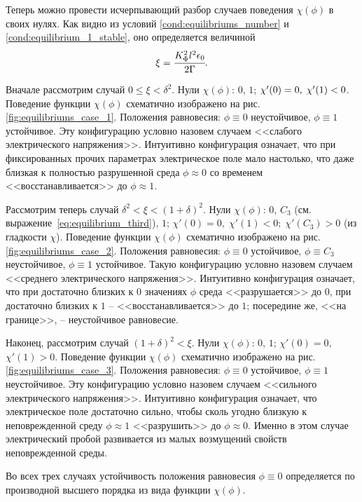 Теперь можно провести исчерпывающий разбор случаев поведения $\chi(\phi)$ в своих нулях. Как видно из условий \eqref{cond:equilibriums_number} и \eqref{cond:equilibrium_1_stable}, оно определяется величиной
\begin{equation}
	\xi = \cfrac{K_\Phi^2 l^2 \epsilon_0}{2 \Gamma} {\text{.}}
	\label{char:equilibriums}
\end{equation}

Вначале рассмотрим случай $0 \leqslant \xi < \delta^2$. Нули $\chi(\phi)$: $0$, $1$; $\chi'(0) = 0, \; \chi'(1) \hm < 0$. Поведение функции $\chi(\phi)$ схематично изображено на рис. \ref{fig:equilibriums_case_1}. Положения равновесия: $\phi \equiv 0$ неустойчивое, $\phi \equiv 1$ устойчивое. Эту конфигурацию условно назовем случаем <<слабого электрического напряжения>>. Интуитивно конфигурация означает, что при фиксированных прочих параметрах электрическое поле мало настолько, что даже близкая к полностью разрушенной среда $\phi \approx 0$ со временем <<восстанавливается>> до $\phi \approx 1$.

Рассмотрим теперь случай $\delta^2 < \xi < (1 + \delta)^2$. Нули $\chi(\phi)$: $0$, $C_3$ (см. выражение~\eqref{eq:equilibrium_third}), $1$; $\chi'(0) = 0, \; \chi'(1) < 0; \; \chi'(C_3) > 0$ (из гладкости $\chi$). Поведение функции $\chi(\phi)$ схематично изображено на рис. \ref{fig:equilibriums_case_2}. Положения равновесия: $\phi \equiv 0$ устойчивое, $\phi \equiv C_3$ неустойчивое, $\phi \equiv 1$ устойчивое. Такую конфигурацию условно назовем случаем <<среднего электрического напряжения>>. Интуитивно конфигурация означает, что при достаточно близких к $0$ значениях $\phi$ среда <<разрушается>> до $0$, при достаточно близких к $1$ -- <<восстанавливается>> до $1$; посередине же, <<на границе>>, -- неустойчивое равновесие.

Наконец, рассмотрим случай $(1 + \delta)^2 < \xi$. Нули $\chi(\phi)$: $0$, $1$; $\chi'(0) = 0,$ $\chi'(1) > 0$. Поведение функции $\chi(\phi)$ схематично изображено на рис. \ref{fig:equilibriums_case_3}. Положения равновесия: $\phi \equiv 0$ устойчивое, $\phi \equiv 1$ неустойчивое. Эту конфигурацию условно назовем случаем <<сильного электрического напряжения>>. Интуитивно конфигурация означает, что электрическое поле достаточно сильно, чтобы сколь угодно близкую к неповрежденной среду $\phi \approx 1$ <<разрушить>> до $\phi \approx 0$. Именно в этом случае электрический пробой развивается из малых возмущений свойств неповрежденной среды.

Во всех трех случаях устойчивость положения равновесия $\phi \equiv 0$ определяется по производной высшего порядка из вида функции $\chi(\phi)$.

